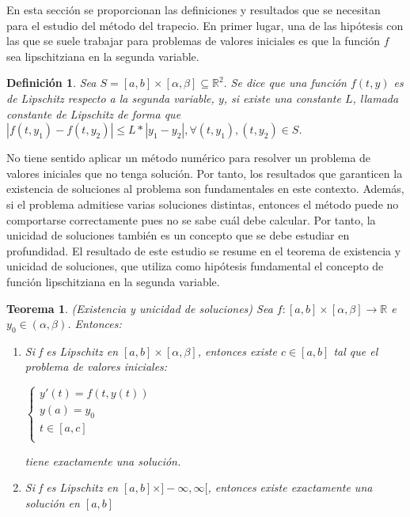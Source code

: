 \documentclass{article}
\theoremstyle{theorem-style}  %
\newtheorem{theorem}{Teorema}[section]  %
\theoremstyle{definition-style}
\newtheorem{definition}{Definición}[section]
\theoremstyle{example-style}
\begin{document}
	En esta sección se proporcionan las definiciones y resultados que se necesitan para el estudio del método del trapecio. En primer lugar, una de las hipótesis con las que se suele trabajar para problemas de valores iniciales es que la función $f$ sea lipschitziana en la segunda variable.
	
	\begin{definition}
		Sea $S = [a,b] \times [\alpha, \beta] \subseteq \mathbb R^2.$ Se dice que una función $f(t,y)$ es de Lipschitz respecto a la segunda variable, $y$, si existe una constante $L$, llamada constante de Lipschitz de forma que $|f(t,y_1) - f(t, y_2)| \le L * |y_1 - y_2|,  \forall (t,y_1), (t,y_2) \in S $.  
	\end{definition}
	
	No tiene sentido aplicar un método numérico para resolver un problema de valores iniciales que no tenga solución. Por tanto, los resultados que garanticen la existencia de soluciones al problema son fundamentales en este contexto. Además, si el problema admitiese varias soluciones distintas, entonces el método puede no comportarse correctamente pues no se sabe cuál debe calcular. Por tanto, la unicidad de soluciones también es un concepto que se debe estudiar en profundidad. El resultado de este estudio se resume en el teorema de existencia y unicidad de soluciones, que utiliza como hipótesis fundamental el concepto de función lipschitziana en la segunda variable.
	
	\begin{theorem} \label{theorem:existence-uniqueness}
		(Existencia y unicidad de soluciones) Sea $f: [a,b]\times[\alpha,\beta] \rightarrow \mathbb{R}$ e $y_0 \in (\alpha,\beta)$. Entonces:
		\begin{enumerate}
			\item Si f es Lipschitz en $[a,b]\times[\alpha,\beta]$, entonces existe $c \in [a,b]$ tal que el problema de valores iniciales:
			\begin{center}
				$\begin{cases}
				y'(t) = f(t,y(t)) \\
				y(a) = y_0 \\
				t \in [a,c] \\
				\end{cases}$
			\end{center}
			tiene exactamente una solución. 
			\item Si f es Lipschitz en $[a,b]\times]-\infty,\infty[$, entonces existe exactamente una solución en $[a,b]$	
		\end{enumerate}
	\end{theorem}
 
\end{document}
